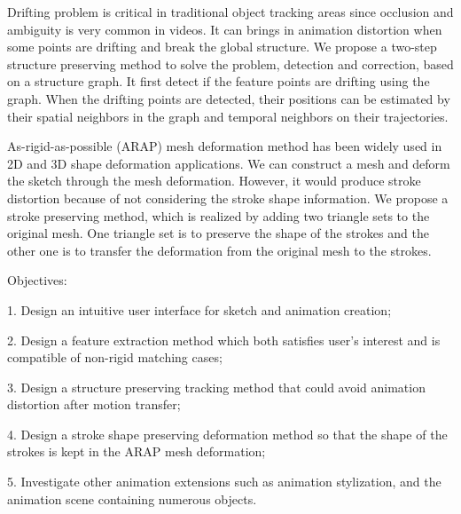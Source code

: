 Drifting problem is critical in traditional object tracking areas since occlusion and ambiguity is very common in videos. It can brings in animation distortion when some points are drifting and break the global structure. We propose a two-step structure preserving method to solve the problem, detection and correction, based on a structure graph. It first detect if the feature points are drifting using the graph. When the drifting points are detected, their positions can be estimated by their spatial neighbors in the graph and temporal neighbors on their trajectories.

As-rigid-as-possible (ARAP) mesh deformation method has been widely used in 2D and 3D shape deformation applications. We can construct a mesh and deform the sketch through the mesh deformation. However, it would produce stroke distortion because of not considering the stroke shape information. We propose a stroke preserving method, which is realized by adding two triangle sets to the original mesh. One triangle set is to preserve the shape of the strokes and the other one is to transfer the deformation from the original mesh to the strokes.


Objectives:

1. Design an intuitive user interface for sketch and animation creation;

2. Design a feature extraction method which both satisfies user's interest and is compatible of non-rigid matching cases;

3. Design a structure preserving tracking method that could avoid animation distortion after motion transfer;

4. Design a stroke shape preserving deformation method so that the shape of the strokes is kept in the ARAP mesh deformation;

5. Investigate other animation extensions such as animation stylization, and the animation scene containing numerous objects.

